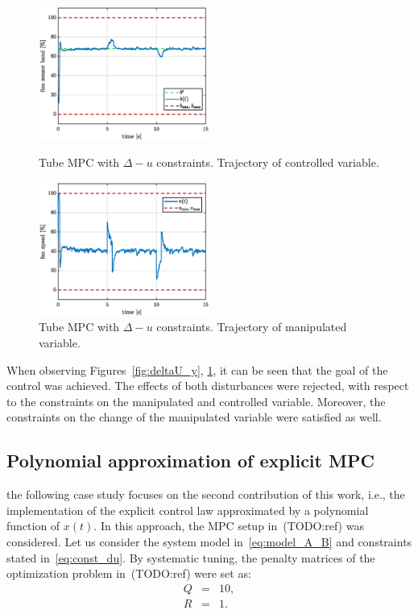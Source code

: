\documentclass[letterpaper, 10 pt, conference]{ieeeconf}
\begin{document}
\begin{figure}
	\begin{center}
		\includegraphics[width=0.5\textwidth]{images/deltaU_b_new.eps}
		\caption{Tube MPC with $\Delta - u$ constraints. Trajectory of controlled variable.}
		\label{fig:deltaU_y}
	\end{center}
%
	\begin{center}
		\includegraphics[width=0.5\textwidth]{images/deltaU_v_new.eps}
		\caption{Tube MPC with $\Delta - u$ constraints. Trajectory of manipulated variable.}
		\label{fig:deltaU_u}
	\end{center}
\end{figure}

When observing Figures~\ref{fig:deltaU_y}, \ref{fig:deltaU_u}, it can be seen that the goal of the control was achieved. The effects of both disturbances were rejected, with respect to the constraints on the manipulated and controlled variable. Moreover, the constraints on the change of the manipulated variable were satisfied as well.

\subsection{Polynomial approximation of explicit MPC}
\label{sec:polynomial_exp}
the following case study focuses on the second contribution of this work, i.e., the implementation of the explicit control law approximated by a polynomial function of $x(t)$. In this approach, the MPC setup in~(TODO:ref) was considered. Let us consider the system model in~\eqref{eq:model_A_B} and constraints stated in~\eqref{eq:const_du}. By systematic tuning, the penalty matrices of the optimization problem in~(TODO:ref) were set as:
\begin{subequations}
	\label{eq:setup_penalty_pol} 
	\begin{eqnarray}
		\label{eq:setup_Q_pol}
		Q &=& 10, \\
		\label{eq:setup_R_pol}
		R &=& 1.
	\end{eqnarray}
\end{subequations}
\end{document}
